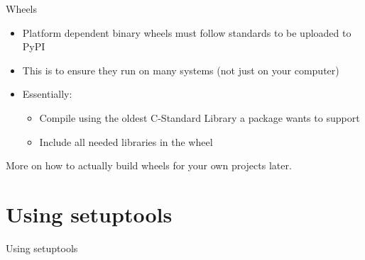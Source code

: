 \documentclass[
  aspectratio=1610,
]{beamer}
\newcommand\headlineframe[1]{%
  \begin{frame}[c]%
    \begin{center}%
      \Huge\color{vertexDarkRed}#1%
    \end{center}%
  \end{frame}%
}%
\begin{document}
\begin{frame}[c]{Wheels}
  \begin{itemize}
    \item Platform dependent binary wheels must follow standards to be uploaded to PyPI
    \item This is to ensure they run on many systems (not just on your computer)
    \item Essentially:
      \begin{itemize}
        \item Compile using the oldest C-Standard Library a package wants to support
        \item Include all needed libraries in the wheel
      \end{itemize}
  \end{itemize}

  \bigskip
  \begin{center}
    \Large More on how to actually build wheels for your own projects later.
  \end{center}
\end{frame}



\section{Using setuptools}
\headlineframe{Using setuptools}
\end{document}
